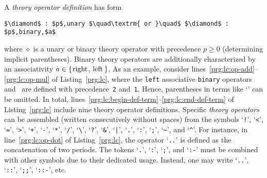 A \emph{theory operator definition} has form
\begin{lstlisting}[numbers=none,mathescape=t]
$\diamond$ : $p$,unary $\quad\textrm{ or }\quad$ $\diamond$ : $p$,binary,$a$
\end{lstlisting}
where $\diamond$ is a unary or binary theory operator with precedence $p\geq 0$
(determining implicit parentheses). %
Binary theory operators are additionally characterized by an associativity
$a\in\{\text{\lstinline{right}},\linebreak[1]\text{\lstinline{left}}\}$.
%
As an example,
consider lines~\ref{prg:lc:op-add}--\ref{prg:lc:op-mul} of Listing~\ref{prg:lc},
where the \lstinline{left} associative \lstinline{binary} operators~\code{+} and~\code{*} are defined with precedence~\lstinline{2} and~\lstinline{1}.
Hence, parentheses in terms like `' can be omitted.
%
In total, lines~\ref{prg:lc:begin-def-term}--\ref{prg:lc:end-def-term} of Listing~\ref{prg:lc}
include nine theory operator definitions.
Specific \emph{theory operators} can be assembled (written consecutively without spaces) from the symbols
`\lstinline{!}',
`\lstinline{<}',
`\lstinline{=}',
`\lstinline{>}',
`\lstinline{+}',
`\lstinline{-}',
`\lstinline{*}',
`\lstinline{/}',
`\lstinline{\}',
`\lstinline{?}',
`\lstinline{&}',
`\lstinline{|}',
`\lstinline{.}',
`\lstinline{:}',
`\lstinline{;}',
`\lstinline{~}', and
`\lstinline{^}'.
%
For instance,
in line~\ref{prg:lc:op-dot} of Listing~\ref{prg:lc}, the operator `\lstinline{..}' is defined as the concatenation of two periods.
%
The tokens
`\lstinline{.}',
`\lstinline{:}',
`\lstinline{;}', and
`\lstinline{:-}'
must be combined with other symbols
due to their dedicated usage.
Instead, one may write
`\lstinline{..}',
`\lstinline{::}',
`\lstinline{;;}',
`\lstinline{::-}',
etc.

